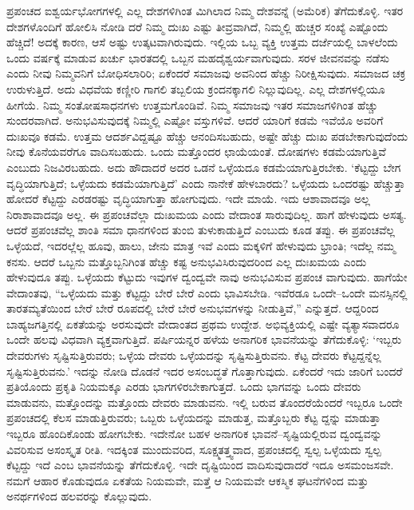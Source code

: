ಪ್ರಪಂಚದ ಐಶ್ವರ್ಯಭೋಗಗಳಲ್ಲಿ ಎಲ್ಲ ದೇಶಗಳಿಗಿಂತ ಮಿಗಿಲಾದ ನಿಮ್ಮ ದೇಶವನ್ನೆ (ಅಮೆರಿಕ) ತೆಗೆದುಕೊಳ್ಳಿ. ಇತರ ದೇಶಗಳೊಂದಿಗೆ ಹೋಲಿಸಿ ನೋಡಿ ದರೆ ನಿಮ್ಮ ದುಃಖ ಎಷ್ಟು ತೀವ್ರವಾಗಿದೆ, ನಿಮ್ಮಲ್ಲಿ ಹುಚ್ಚರ ಸಂಖ್ಯೆ ಎಷ್ಟೊಂದು ಹೆಚ್ಚಿದೆ! ಅದಕ್ಕೆ ಕಾರಣ, ಆಸೆ ಅಷ್ಟು ಉತ್ಕಟವಾಗಿರುವುದು. ಇಲ್ಲಿಯ ಒಬ್ಬ ವ್ಯಕ್ತಿ ಉತ್ತಮ ದರ್ಜೆಯಲ್ಲಿ ಬಾಳಲೆಂದು ಒಂದು ವರ್ಷಕ್ಕೆ ಮಾಡುವ ಖರ್ಚು ಭಾರತದಲ್ಲಿ ಒಬ್ಬನ ಮಹದೈಶ್ವರ್ಯವಾಗುವುದು. ಸರಳ ಜೀವನವನ್ನು ನಡೆಸು ಎಂದು ನೀವು ನಿಮ್ಮವನಿಗೆ ಬೋಧಿಸಲಾರಿರಿ; ಏಕೆಂದರೆ ಸಮಾಜವು ಅವನಿಂದ ಹೆಚ್ಚು ನಿರೀಕ್ಷಿಸುವುದು. ಸಮಾಜದ ಚಕ್ರ ಉರುಳುತ್ತಿದೆ. ಅದು ವಿಧವೆಯ ಕಣ್ಣೀರಿ ಗಾಗಲಿ ತಬ್ಬಲಿಯ ಕ್ರಂದನಕ್ಕಾಗಲಿ ನಿಲ್ಲುವುದಿಲ್ಲ. ಎಲ್ಲ ದೇಶಗಳಲ್ಲಿಯೂ ಹೀಗೆಯೆ. ನಿಮ್ಮ ಸಂತೋಷಸಾಧನಗಳು ಉತ್ತಮಗೊಂಡಿವೆ. ನಿಮ್ಮ ಸಮಾಜವು ಇತರ ಸಮಾಜಗಳಿಗಿಂತ ಹೆಚ್ಚು ಸುಂದರವಾಗಿದೆ. ಅನುಭವಿಸುವುದಕ್ಕೆ ನಿಮ್ಮಲ್ಲಿ ಎಷ್ಟೋ ವಸ್ತುಗಳಿವೆ. ಆದರೆ ಯಾರಿಗೆ ಕಡಮೆ ಇವೆಯೊ ಅವರಿಗೆ ದುಃಖವೂ ಕಡಮೆ. ಉತ್ತಮ ಆದರ್ಶವಿದ್ದಷ್ಟೂ ಹೆಚ್ಚು ಆನಂದಿಸಬಹುದು, ಅಷ್ಟೇ ಹೆಚ್ಚು ದುಃಖ ಪಡಬೇಕಾಗುವುದೆಂದು ನೀವು ಕೊನೆಯವರೆಗೂ ವಾದಿಸಬಹುದು. ಒಂದು ಮತ್ತೊಂದರ ಛಾಯೆಯಂತೆ. ದೋಷಗಳು ಕಡಮೆಯಾಗುತ್ತಿವೆ ಎಂಬುದು ನಿಜವಿರಬಹುದು. ಅದು ಹೌದಾದರೆ ಅದರ ಒಡನೆ ಒಳ್ಳೆಯದೂ ಕಡಮೆಯಾಗುತ್ತಿರಬೇಕು. ‘ಕೆಟ್ಟದ್ದು ಬೇಗ ವೃದ್ಧಿಯಾಗುತ್ತಿದೆ; ಒಳ್ಳೆಯದು ಕಡಮೆಯಾಗುತ್ತಿದೆ’ ಎಂದು ನಾನೇಕೆ ಹೇಳಬಾರದು? ಒಳ್ಳೆಯದು ಒಂದರಷ್ಟು ಹೆಚ್ಚುತ್ತಾ ಹೋದರೆ ಕೆಟ್ಟದ್ದು ಎರಡರಷ್ಟು ವೃದ್ಧಿಯಾಗುತ್ತಾ ಹೋಗುವುದು. ಇದೇ ಮಾಯೆ. ಇದು ಆಶಾವಾದವೂ ಅಲ್ಲ ನಿರಾಶಾವಾದವೂ ಅಲ್ಲ. ಈ ಪ್ರಪಂಚವೆಲ್ಲಾ ದುಃಖಮಯ ಎಂದು ವೇದಾಂತ ಸಾರುವುದಿಲ್ಲ. ಹಾಗೆ ಹೇಳುವುದು ಅಸತ್ಯ. ಆದರೆ ಪ್ರಪಂಚವೆಲ್ಲ ಶಾಂತಿ ಸಮಾ ಧಾನಗಳಿಂದ ತುಂಬಿ ತುಳುಕಾಡುತ್ತಿದೆ ಎಂಬುದು ಕೂಡ ತಪ್ಪು. ಈ ಪ್ರಪಂಚವೆಲ್ಲ ಒಳ್ಳೆಯದೆ, ಇದರಲ್ಲೆಲ್ಲ ಹೂವು, ಹಾಲು, ಜೇನು ಮಾತ್ರ ಇವೆ ಎಂದು ಮಕ್ಕಳಿಗೆ ಹೇಳುವುದು ಭ್ರಾಂತಿ; ಇದೆಲ್ಲ ನಮ್ಮ ಕನಸು. ಆದರೆ ಒಬ್ಬನು ಮತ್ತೊಬ್ಬನಿಗಿಂತ ಹೆಚ್ಚು ಕಷ್ಟ ಅನುಭವಿಸಿರುವುದರಿಂದ ಎಲ್ಲ ದುಃಖಮಯ ಎಂದು ಹೇಳುವುದೂ ತಪ್ಪು. ಒಳ್ಳೆಯದು ಕೆಟ್ಟುದು ಇವುಗಳ ದ್ವಂದ್ವವೇ ನಾವು ಅನುಭವಿಸುವ ಪ್ರಪಂಚ ವಾಗುವುದು. ಹಾಗೆಯೇ ವೇದಾಂತವು, “ಒಳ್ಳೆಯದು ಮತ್ತು ಕೆಟ್ಟದ್ದು ಬೇರೆ ಬೇರೆ ಎಂದು ಭಾವಿಸಬೇಡಿ. ಇವೆರಡೂ ಒಂದೇ–ಒಂದೇ ಮನಸ್ಸಿನಲ್ಲಿ ತಾರತಮ್ಯತೆಯಿಂದ ಬೇರೆ ಬೇರೆ ರೂಪದಲ್ಲಿ ಬೇರೆ ಬೇರೆ ಅನುಭವಗಳನ್ನು ನೀಡುತ್ತಿವೆ,” ಎನ್ನುತ್ತದೆ. ಆದ್ದರಿಂದ ಬಾಹ್ಯಜಗತ್ತಿನಲ್ಲಿ ಏಕತೆಯನ್ನು ಅರಸುವುದೇ ವೇದಾಂತದ ಪ್ರಥಮ ಉದ್ದೇಶ. ಅಭಿವ್ಯಕ್ತಿಯಲ್ಲಿ ಎಷ್ಟೇ ವ್ಯತ್ಯಾಸವಾದರೂ ಒಂದೇ ಹಲವು ವಿಧವಾಗಿ ವ್ಯಕ್ತವಾಗುತ್ತಿದೆ. ಪರ್ಷಿಯನ್ನರ ಹಳೆಯ ಅನಾಗರಿಕ ಭಾವನೆಯನ್ನು ತೆಗೆದುಕೊಳ್ಳಿ: ‘ಇಬ್ಬರು ದೇವರುಗಳು ಸೃಷ್ಟಿಸುತ್ತಿರುವರು; ಒಳ್ಳೆಯ ದೇವರು ಒಳ್ಳೆಯದನ್ನು ಸೃಷ್ಟಿಸುತ್ತಿರುವನು. ಕೆಟ್ಟ ದೇವರು ಕೆಟ್ಟದ್ದನ್ನೆಲ್ಲ ಸೃಷ್ಟಿಸುತ್ತಿರುವನು.’ ಇದನ್ನು ನೋಡಿ ದೊಡನೆ ಇದರ ಅಸಂಬದ್ಧತೆ ಗೊತ್ತಾಗುವುದು. ಏಕೆಂದರೆ ಇದು ಜಾರಿಗೆ ಬಂದರೆ ಪ್ರತಿಯೊಂದು ಪ್ರಕೃತಿ ನಿಯಮಕ್ಕೂ ಎರಡು ಭಾಗಗಳಿರಬೇಕಾಗುತ್ತದೆ. ಒಂದು ಭಾಗವನ್ನು ಒಂದು ದೇವರು ಮಾಡುವನು, ಮತ್ತೊಂದನ್ನು ಮತ್ತೊಂದು ದೇವರು ಮಾಡುವನು. ಇಲ್ಲಿ ಬರುವ ತೊಂದರೆಯೆಂದರೆ ಇಬ್ಬರೂ ಒಂದೇ ಪ್ರಪಂಚದಲ್ಲಿ ಕೆಲಸ ಮಾಡುತ್ತಿರುವರು; ಒಬ್ಬರು ಒಳ್ಳೆಯದನ್ನು ಮಾಡುತ್ತ, ಮತ್ತೊಬ್ಬರು ಕೆಟ್ಟ ದ್ದನ್ನು ಮಾಡುತ್ತಾ ಇಬ್ಬರೂ ಹೊಂದಿಕೊಂಡು ಹೋಗಬೇಕು. ಇದೇನೋ ಬಹಳ ಅನಾಗರಿಕ ಭಾವನೆ–ಸೃಷ್ಟಿಯಲ್ಲಿರುವ ದ್ವಂದ್ವವನ್ನು ವಿವರಿಸುವ ಅಸಂಸ್ಕೃತ ರೀತಿ. ಇದಕ್ಕಿಂತ ಮುಂದುವರಿದ, ಸೂಕ್ಷ್ಮತತ್ತ್ವವಾದ, ಪ್ರಪಂಚದಲ್ಲಿ ಸ್ವಲ್ಪ ಒಳ್ಳೆಯದು ಸ್ವಲ್ಪ ಕೆಟ್ಟದ್ದು ಇದೆ ಎಂಬ ಭಾವನೆಯನ್ನು ತೆಗೆದುಕೊಳ್ಳಿ. ಇದೇ ದೃಷ್ಟಿಯಿಂದ ವಾದಿಸುವುದಾದರೆ ಇದೂ ಅಸಮಂಜಸವೇ. ನಮಗೆ ಆಹಾರ ಕೊಡುವುದೂ ಏಕತೆಯ ನಿಯಮವೇ, ಮತ್ತೆ ಆ ನಿಯಮವೇ ಆಕಸ್ಮಿಕ ಘಟನೆಗಳಿಂದ ಮತ್ತು ಅನರ್ಥಗಳಿಂದ ಹಲವರನ್ನು ಕೊಲ್ಲುವುದು.

